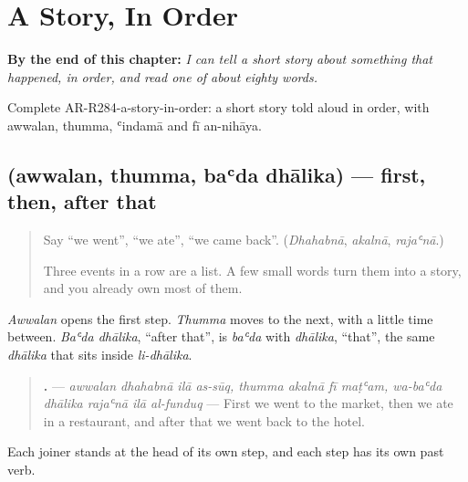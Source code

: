 
\chapter{A Story, In Order}
\label{ch:ar-a-story-in-order}

\begin{chapteropening}
\textbf{By the end of this chapter:} \emph{I can tell a short story about something that happened, in order, and read one of about eighty words.}

Complete AR-R284-a-story-in-order: a short story told aloud in order, with awwalan, thumma, ʿindamā and fī an-nihāya.
\end{chapteropening}

\section[\texorpdfstring{\ar{أولا،} \ar{ثم،} \ar{بعد} \ar{ذلك} (awwalan, thumma …)}{أولا، ثم، بعد ذلك (awwalan, thumma …)}]{    (awwalan, thumma, baʿda dhālika) — first, then, after that}

\label{lesson:AR-C284-awwalan-thumma}



\begin{quote}
Say \textquotedblleft{}we went\textquotedblright{}, \textquotedblleft{}we ate\textquotedblright{}, \textquotedblleft{}we came back\textquotedblright{}. (\emph{Dhahabnā}, \emph{akalnā}, \emph{rajaʿnā}.)

Three events in a row are a list. A few small words turn them into a story, and you already own most of them.
\end{quote}

\begin{grammarlens}[title={Grammar Lens: first, then, after that}]
\emph{Awwalan} opens the first step. \emph{Thumma} moves to the next, with a little time between. \emph{Baʿda dhālika}, \textquotedblleft{}after that\textquotedblright{}, is \emph{baʿda} with \emph{dhālika}, \textquotedblleft{}that\textquotedblright{}, the same \emph{dhālika} that sits inside \emph{li-dhālika}.

\begin{quote}
\textbf{            .} — \emph{awwalan dhahabnā ilā as-sūq, thumma akalnā fī maṭʿam, wa-baʿda dhālika rajaʿnā ilā al-funduq} — First we went to the market, then we ate in a restaurant, and after that we went back to the hotel.
\end{quote}

Each joiner stands at the head of its own step, and each step has its own past verb.
\end{grammarlens}

